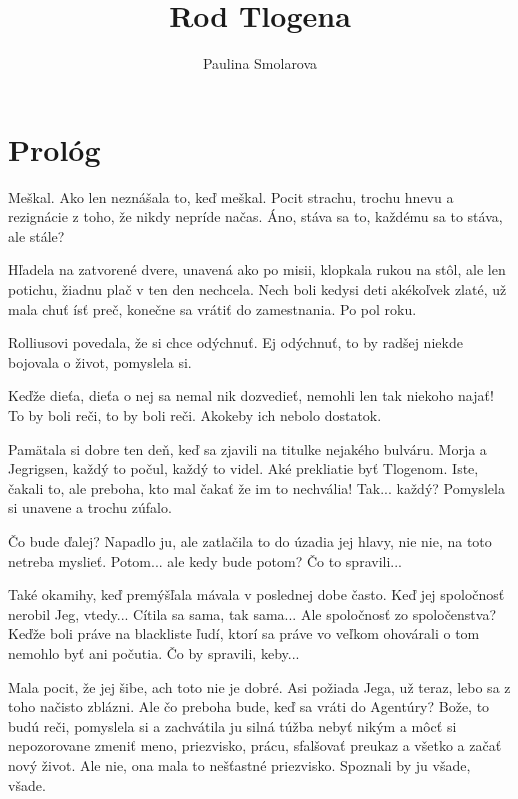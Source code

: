 \documentclass{book}
\author{Paulina Smolarova}
\title{Rod Tlogena}
\begin{document}
\maketitle

\newpage

\tableofcontents

\chapter*{Prológ}

Meškal. Ako len neznášala to, keď meškal. Pocit strachu, trochu hnevu a rezignácie z toho, že nikdy nepríde načas. Áno, stáva sa to, každému sa to stáva, ale stále?

Hľadela na zatvorené dvere, unavená ako po misii, klopkala rukou na stôl, ale len potichu, žiadnu plač v ten den nechcela. Nech boli kedysi deti akékoľvek zlaté, už mala chuť ísť preč, konečne sa vrátiť do zamestnania. Po pol roku.

Rolliusovi povedala, že si chce odýchnuť. Ej odýchnuť, to by radšej niekde bojovala o život, pomyslela si.

Keďže dieťa, dieťa o nej sa nemal nik dozvedieť, nemohli len tak niekoho najať! To by boli reči, to by boli reči. Akokeby ich nebolo dostatok.

Pamätala si dobre ten deň, keď sa zjavili na titulke nejakého bulváru. Morja a Jegrigsen, každý to počul, každý to videl. Aké prekliatie byť Tlogenom. Iste, čakali to, ale preboha, kto mal čakať že im to nechvália! Tak... každý? Pomyslela si unavene a trochu zúfalo.

Čo bude ďalej? Napadlo ju, ale zatlačila to do úzadia jej hlavy, nie nie, na toto netreba myslieť. Potom... ale kedy bude potom? Čo to spravili...

Také okamihy, keď premýšľala mávala v poslednej dobe často. Keď jej spoločnosť nerobil Jeg, vtedy... Cítila sa sama, tak sama... Ale spoločnosť zo spoločenstva? Keďže boli práve na blackliste ľudí, ktorí sa práve vo veľkom ohovárali o tom nemohlo byť ani počutia. Čo by spravili, keby...

Mala pocit, že jej šibe, ach toto nie je dobré. Asi požiada Jega, už teraz, lebo sa z toho načisto zblázni. Ale čo preboha bude, keď sa vráti do Agentúry? Bože, to budú reči, pomyslela si a zachvátila ju silná túžba nebyť nikým a môcť si nepozorovane zmeniť meno, priezvisko, prácu, sfalšovať preukaz a všetko a začať nový život. Ale nie, ona mala to nešťastné priezvisko. Spoznali by ju všade, všade.
\end{document}
